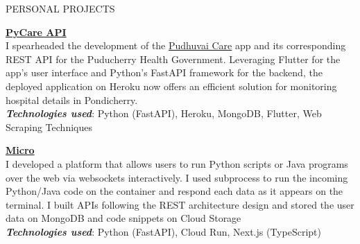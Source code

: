 \documentclass{template}
\begin{document}
\begin{rSection}{PERSONAL PROJECTS}

\textbf{\href{https://github.com/princesanjivy/pycare-api}{PyCare API}} \\
I spearheaded the development of the \href{https://sites.google.com/view/dscpec/pudhuvai-care}{Pudhuvai Care} app and its corresponding REST API for the Puducherry Health Government. Leveraging Flutter for the app's user interface and Python's FastAPI framework for the backend, the deployed application on Heroku now offers an efficient solution for monitoring hospital details in Pondicherry. \\
\textbf{\textit{Technologies used}}: Python (FastAPI), Heroku, MongoDB, Flutter, Web Scraping Techniques

\textbf{\href{https://runmicro.princeappstrudio.in}{Micro}} \\
I developed a platform that allows users to run Python scripts or Java programs over the web via websockets interactively. I used subprocess to run the incoming Python/Java code on the container and respond each data as it appears on the terminal. I built APIs following the REST architecture design and stored the user data on MongoDB and code snippets on Cloud Storage\\
\textbf{\textit{Technologies used}}: Python (FastAPI), Cloud Run, Next.js (TypeScript)






\end{rSection}
\end{document}
